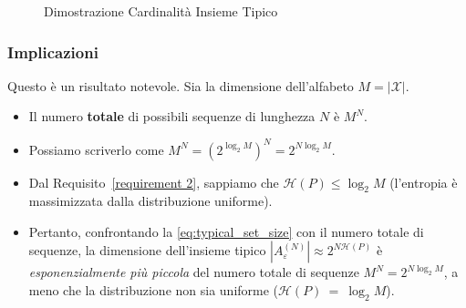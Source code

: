 \begin{enumerate}
\begin{figure}[htbp]
{
    } %

    \caption{Dimostrazione Cardinalità Insieme Tipico}
    \label{fig:CardinalityTypSet}
\end{figure}


\clearpage


\subsubsection{Implicazioni}
Questo è un risultato notevole. Sia la dimensione dell'alfabeto $M = |\mathcal{X}|$.
\begin{itemize}
    \item Il numero \textbf{totale} di possibili sequenze di lunghezza $N$ è $M^N$.
    \item Possiamo scriverlo come $M^N = (2^{ \log_2 M})^N = 2^{N \log_2 M}$.
    \item Dal Requisito~\ref{requirement 2}, sappiamo che $\mathcal{H}(P) \leq \log_2 M$ (l'entropia è massimizzata dalla distribuzione uniforme).
    \item Pertanto, confrontando la \eqref{eq:typical_set_size} con il numero totale di sequenze, la dimensione dell'insieme tipico $|A_\varepsilon^{(N)}| \approx 2^{N\mathcal{H}(P)}$ è \textit{esponenzialmente più piccola} del numero totale di sequenze $M^N = 2^{N \log_2 M}$, a meno che la distribuzione non sia uniforme ($\mathcal{H}(P)~=~\log_2 M$).
\end{itemize}


\end{enumerate}
